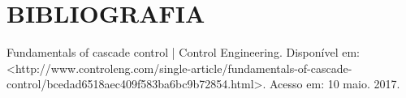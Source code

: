 \documentclass[a4paper,12pt]{article}
\begin{document}

\thispagestyle{empty}
\section{BIBLIOGRAFIA}

Fundamentals of cascade control | Control Engineering. Disponível em: <http://www.controleng.com/single-article/fundamentals-of-cascade-control/bcedad6518aec409f583ba6bc9b72854.html>. Acesso em: 10 maio. 2017.





%


%
\end{document}
